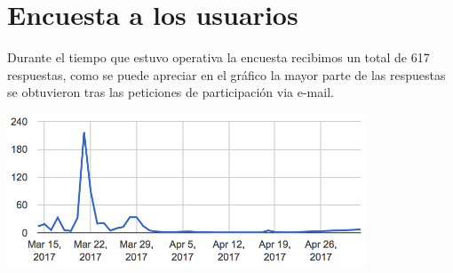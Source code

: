 \section{Encuesta a los usuarios}

Durante el tiempo que estuvo operativa la encuesta recibimos un total de 617 respuestas, como se puede apreciar en el gráfico la mayor parte de las respuestas se obtuvieron tras las peticiones de participación via e-mail.

    \includegraphics[width=0.8\textwidth]{../charts/00_fecha}


